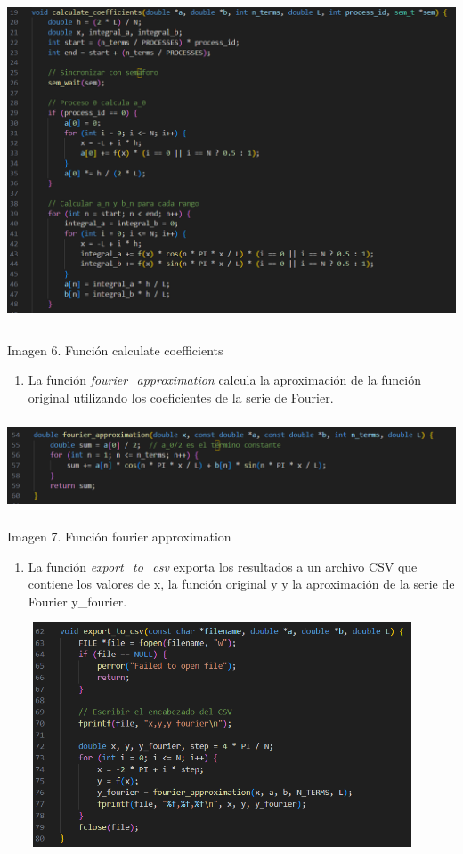 \includegraphics[width=5.64741in,height=3.85562in]{media/image39.png}

Imagen 6. Función calculate coefficients

\begin{enumerate} \def\labelenumi{\arabic{enumi}.} \setcounter{enumi}{2} \item   La función \emph{fourier\_approximation} calcula la aproximación de la   función original utilizando los coeficientes de la serie de Fourier. \end{enumerate}

\includegraphics[width=6.26772in,height=1.08333in]{media/image11.png}

Imagen 7. Función fourier approximation

\begin{enumerate} \def\labelenumi{\arabic{enumi}.} \setcounter{enumi}{3} \item   La función \emph{export\_to\_csv} exporta los resultados a un archivo   CSV que contiene los valores de x, la función original y y la   aproximación de la serie de Fourier y\_fourier. \end{enumerate}

\includegraphics[width=5.02604in,height=2.61756in]{media/image50.png}

